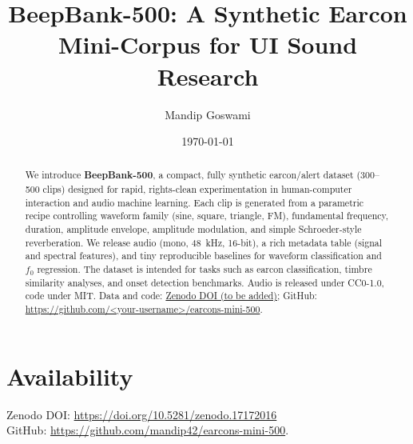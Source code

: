 \documentclass[11pt]{article}
\title{BeepBank-500: A Synthetic Earcon Mini-Corpus for UI Sound Research}
\author{Mandip Goswami}
\date{\today}
\begin{document}
\maketitle

\begin{abstract}
We introduce \textbf{BeepBank-500}, a compact, fully synthetic earcon/alert dataset (300--500 clips) designed for rapid, rights-clean experimentation in human-computer interaction and audio machine learning. Each clip is generated from a parametric recipe controlling waveform family (sine, square, triangle, FM), fundamental frequency, duration, amplitude envelope, amplitude modulation, and simple Schroeder-style reverberation. We release audio (mono, 48~kHz, 16-bit), a rich metadata table (signal and spectral features), and tiny reproducible baselines for waveform classification and $f_0$ regression. The dataset is intended for tasks such as earcon classification, timbre similarity analyses, and onset detection benchmarks. Audio is released under CC0-1.0, code under MIT. Data and code: \href{https://doi.org/10.5281/zenodo.XXXXXXX}{Zenodo DOI (to be added)}; GitHub: \url{https://github.com/<your-username>/earcons-mini-500}.
\end{abstract}


\section{Availability}
Zenodo DOI: \url{https://doi.org/10.5281/zenodo.17172016} \\
GitHub: \url{https://github.com/mandip42/earcons-mini-500}.
\end{document}
